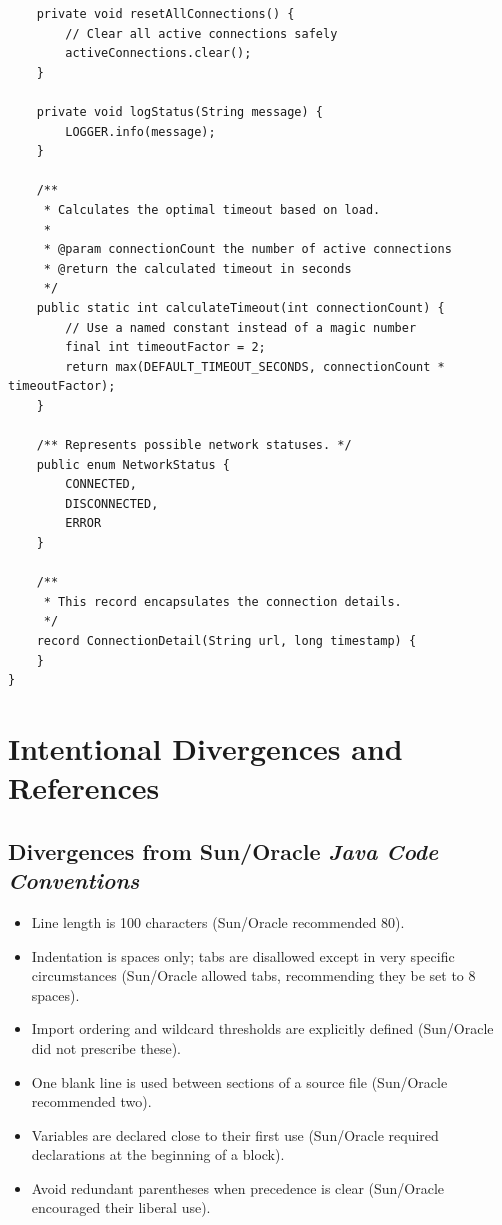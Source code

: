\documentclass{article}
\begin{document}
\begin{lstlisting}
    private void resetAllConnections() {
        // Clear all active connections safely
        activeConnections.clear();
    }

    private void logStatus(String message) {
        LOGGER.info(message);
    }

    /**
     * Calculates the optimal timeout based on load.
     *
     * @param connectionCount the number of active connections
     * @return the calculated timeout in seconds
     */
    public static int calculateTimeout(int connectionCount) {
        // Use a named constant instead of a magic number
        final int timeoutFactor = 2;
        return max(DEFAULT_TIMEOUT_SECONDS, connectionCount * timeoutFactor);
    }

    /** Represents possible network statuses. */
    public enum NetworkStatus {
        CONNECTED,
        DISCONNECTED,
        ERROR
    }

    /**
     * This record encapsulates the connection details.
     */
    record ConnectionDetail(String url, long timestamp) {
    }
}
\end{lstlisting}

\appendix

\section{Intentional Divergences and References}

\subsection{Divergences from Sun/Oracle \emph{Java Code Conventions}}

\begin{itemize}
\item Line length is 100 characters (Sun/Oracle recommended 80).
\item Indentation is spaces only; tabs are disallowed except in very specific circumstances
  (Sun/Oracle allowed tabs, recommending they be set to 8 spaces).
\item Import ordering and wildcard thresholds are explicitly defined (Sun/Oracle did not prescribe
  these).
\item One blank line is used between sections of a source file (Sun/Oracle recommended two).
\item Variables are declared close to their first use (Sun/Oracle required declarations at the
  beginning of a block).
\item Avoid redundant parentheses when precedence is clear (Sun/Oracle encouraged their liberal
  use).
\end{itemize}
\end{document}
